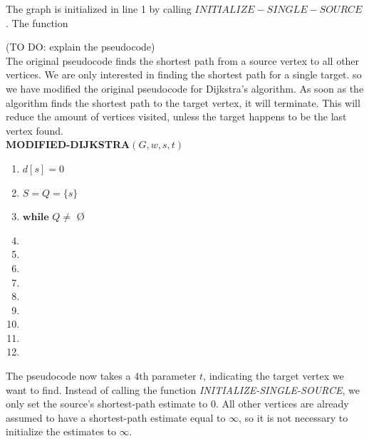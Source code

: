 \documentclass[11pt]{article}
\begin{document}
\noindent The graph is initialized in line 1 by calling $INITIALIZE-SINGLE-SOURCE$. The function 

(TO DO: explain the pseudocode)\\








\noindent The original pseudocode finds the shortest path from a source vertex to all other vertices. We are only interested in finding the shortest path for a single target. so we have modified the original pseudocode for Dijkstra's algorithm. As soon as the algorithm finds the shortest path to the target vertex, it will terminate. This will reduce the amount of vertices visited, unless the target happens to be the last vertex found.\\

\textbf{MODIFIED-DIJKSTRA$(G, w, s, t)$}
\begin{enumerate}
\setlength\itemsep{0em}
\item $d[s] = 0$
\item $S = Q = \{s\}$
\item $\textbf{while } Q \neq  $ \O
\item {}
\item {}
\item \tab{}
\item {}
\item \tab{}
\item \tab{}\tab{}
\item \tab{}\tab{}
\item \tab{}\tab{}
\item \tab{}\tab{}
\end{enumerate}

\noindent The pseudocode now takes a 4th parameter $t$, indicating the target vertex we want to find. Instead of calling the function \textit{INITIALIZE-SINGLE-SOURCE}, we only set the source's shortest-path estimate to 0. All other vertices are already assumed to have a shortest-path estimate equal to $\infty$, so it is not necessary to initialize the estimates to $\infty$.\\
\end{document}
